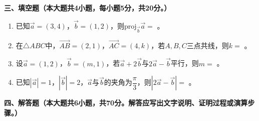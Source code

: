 \documentclass[12pt, a4paper]{ctexart}
\newcommand{\blank}[1]{\underline{\hspace{#1}}}
\begin{document}
\vspace{1em}

\noindent\textbf{三、填空题（本大题共4小题，每小题5分，共20分。）}

\begin{enumerate}[start=13]
\item 已知$\vec{a}=(3,4)$，$\vec{b}=(1,2)$，则$\text{proj}_{\vec{b}}\vec{a}=$ \blank{4cm}。

\item 在$\triangle ABC$中，$\overrightarrow{AB}=(2,1)$，$\overrightarrow{AC}=(4,k)$，若$A,B,C$三点共线，则$k=$ \blank{2cm}。

\item 设$\vec{a}=(1,2)$，$\vec{b}=(m,1)$，若$\vec{a}+2\vec{b}$与$2\vec{a}-\vec{b}$平行，则$m=$ \blank{2cm}。

\item 已知$|\vec{a}|=1$，$|\vec{b}|=2$，$\vec{a}$与$\vec{b}$的夹角为$\dfrac{\pi}{3}$，则$|2\vec{a}-\vec{b}|=$ \blank{2cm}。
\end{enumerate}

\vspace{1em}

\noindent\textbf{四、解答题（本大题共6小题，共70分。解答应写出文字说明、证明过程或演算步骤。）}
\end{document}
